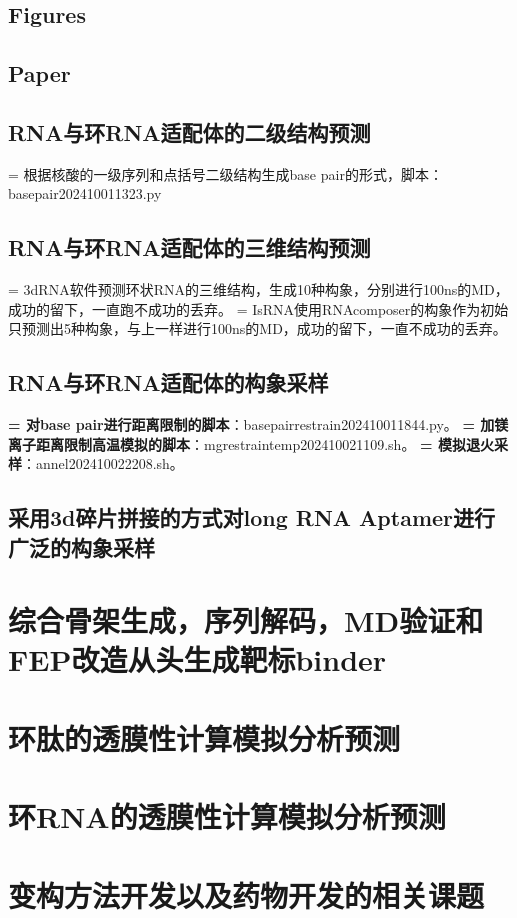 \subsection{Figures}
\subsection{Paper}
\subsection{RNA与环RNA适配体的二级结构预测}
\noindent = 根据核酸的一级序列和点括号二级结构生成base pair的形式，脚本：basepair202410011323.py
\subsection{RNA与环RNA适配体的三维结构预测}
\noindent = 3dRNA软件预测环状RNA的三维结构，生成10种构象，分别进行100ns的MD，成功的留下，一直跑不成功的丢弃。
\newline = IsRNA使用RNAcomposer的构象作为初始只预测出5种构象，与上一样进行100ns的MD，成功的留下，一直不成功的丢弃。
\subsection{RNA与环RNA适配体的构象采样}
\noindent \textbf{= 对base pair进行距离限制的脚本}：basepairrestrain202410011844.py。
\newline \textbf{= 加镁离子距离限制高温模拟的脚本}：mgrestraintemp202410021109.sh。
\newline \textbf{= 模拟退火采样}：annel202410022208.sh。
\subsection{采用3d碎片拼接的方式对long RNA Aptamer进行广泛的构象采样}
\section{综合骨架生成，序列解码，MD验证和FEP改造从头生成靶标binder}
\section{环肽的透膜性计算模拟分析预测}
\section{环RNA的透膜性计算模拟分析预测}
\section{变构方法开发以及药物开发的相关课题}
